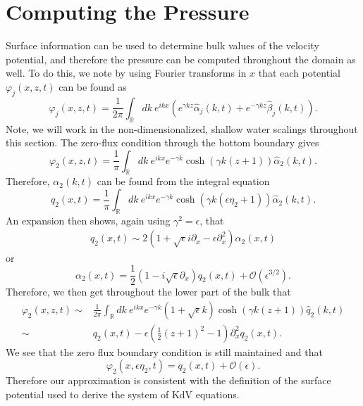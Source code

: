 \documentclass[a4paper,11pt]{article}
\newcommand{\p}{\partial}
\begin{document}
\section{Computing the Pressure}
Surface information can be used to determine bulk values of the velocity potential, and therefore the pressure can be computed throughout the domain as well.  To do this, we note by using Fourier transforms in $x$ that each potential $\varphi_{j}(x,z,t)$ can be found as 
\[
\varphi_{j}(x,z,t) = \frac{1}{2\pi}\int_{\mathbb{R}}dk ~e^{ikx}\left(e^{\gamma k z} \hat{\alpha}_{j}(k,t)+ e^{-\gamma k z}\hat{\beta}_{j}(k,t)\right).
\]
Note, we will work in the non-dimensionalized, shallow water scalings throughout this section.  The zero-flux condition through the bottom boundary gives 
\[
\varphi_{2}(x,z,t) = \frac{1}{\pi}\int_{\mathbb{R}}dk ~e^{ikx}e^{-\gamma k}\cosh(\gamma k (z+1))\hat{\alpha}_{2}(k,t).
\]
Therefore, $\alpha_{2}(k,t)$ can be found from the integral equation 
\[
q_{2}(x,t) = \frac{1}{\pi}\int_{\mathbb{R}}dk ~e^{ikx}e^{-\gamma k}\cosh(\gamma k(\epsilon \eta_{2}+1))\hat{\alpha}_{2}(k,t).
\]
An expansion then shows, again using $\gamma^{2}=\epsilon$, that 
\begin{align*}
q_{2}(x,t) \sim 2\left(1 + \sqrt{\epsilon}i\p_{x} -\epsilon \p_{x}^{2}\right)\alpha_{2}(x,t)
\end{align*}
or 
\[
\alpha_{2}(x,t) = \frac{1}{2}\left(1-i\sqrt{\epsilon}\p_{x}\right)q_{2}(x,t) + \mathcal{O}(\epsilon^{3/2}).
\]
Therefore, we then get throughout the lower part of the bulk that 
\begin{align*}
\varphi_{2}(x,z,t) \sim & \frac{1}{2\pi}\int_{\mathbb{R}}dk ~e^{ikx}e^{-\gamma k}\left(1+\sqrt{\epsilon}k\right)\cosh(\gamma k (z+1))\hat{q}_{2}(k,t)\\
\sim & q_{2}(x,t) -\epsilon \left(\frac{1}{2}(z+1)^{2}-1 \right)\p_{x}^{2}q_{2}(x,t).
\end{align*}
We see that the zero flux boundary condition is still maintained and that 
\[
\varphi_{2}(x,\epsilon\eta_{2},t) = q_{2}(x,t) + \mathcal{O}(\epsilon).
\]
Therefore our approximation is consistent with the definition of the surface potential used to derive the system of KdV equations.  
\end{document}
